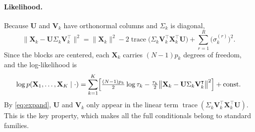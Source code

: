 \documentclass[11pt]{article}
\DeclareMathOperator{\trace}{\mathrm{trace}}
\newcommand{\X}{\mathbf{X}}
\newcommand{\U}{\mathbf{U}}
\newcommand{\V}{\mathbf{V}}
\begin{document}
\paragraph{Likelihood.} Because $\U$ and $\V_k$ have orthonormal columns and $\Sigma_k$ is diagonal,
\begin{equation}
  \bigl\|\X_k-\U\Sigma_k\V_k^\intercal\bigr\|^2
  =\|\X_k\|^2-2\trace\bigl(\Sigma_k\V_k^\intercal\X_k^\intercal\U\bigr)+\sum_{r=1}^R\bigl(\sigma_k^{(r)}\bigr)^2 .
  \label{eq:expand}
\end{equation}
Since the blocks are centered, each $\X_k$ carries $(N-1)p_k$ degrees of freedom, and the log-likelihood is
\[
  \log p(\X_1,\ldots,\X_K\mid\cdot)=\sum_{k=1}^K\Bigl[\tfrac{(N-1)p_k}{2}\log\tau_k
  -\tfrac{\tau_k}{2}\bigl\|\X_k-\U\Sigma_k\V_k^\intercal\bigr\|^2\Bigr]+\text{const}.
\]
By \eqref{eq:expand}, $\U$ and $\V_k$ only appear in the linear term $\trace(\Sigma_k\V_k^\intercal\X_k^\intercal\U)$.
This is the key property, which makes all the full conditionals belong to standard families.
\end{document}
